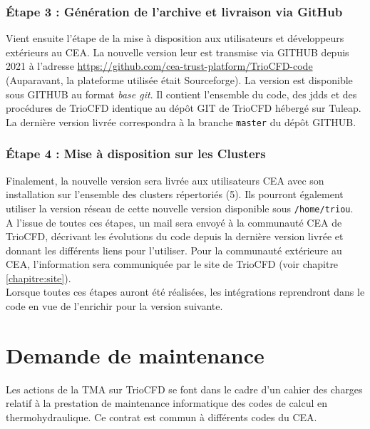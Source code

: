\subsection{Étape 3 : G\'en\'eration de l'archive et livraison via GitHub}
Vient ensuite l'étape de la mise à disposition aux utilisateurs et développeurs extérieurs au CEA.
La nouvelle version leur est transmise via GITHUB depuis 2021
à l'adresse \url{https://github.com/cea-trust-platform/TrioCFD-code}
(Auparavant, la plateforme utilisée était Sourceforge).
La version est disponible sous GITHUB au format \emph{base git}.
Il contient l'ensemble du code, des jdds et des procédures de TrioCFD
identique au dépôt GIT de TrioCFD hébergé sur Tuleap.
La dernière version livrée correspondra à la branche \texttt{master} du dépôt GITHUB.

\subsection{Étape 4 : Mise \`a disposition sur les Clusters}
Finalement, la nouvelle version sera livrée aux utilisateurs CEA avec son installation
sur l'ensemble des clusters répertoriés (5).
Ils pourront également utiliser la version réseau de cette nouvelle
version disponible sous \texttt{/home/triou}.\\

A l'issue de toutes ces étapes, un mail sera envoyé à la communauté CEA de TrioCFD,
décrivant les évolutions du code depuis la dernière version livrée et
donnant les différents liens pour l'utiliser. Pour la communauté extérieure au CEA,
l'information sera communiquée par le site de TrioCFD (voir chapitre \ref{chapitre:site}).\\

Lorsque toutes ces \'etapes auront \'et\'e r\'ealis\'ees,
les intégrations reprendront dans le code en vue de l'enrichir pour la version suivante.

\chapter{Demande de maintenance}
Les actions de la TMA sur TrioCFD se font dans le cadre d'un cahier des charges relatif à
la prestation de maintenance informatique des codes de calcul en thermohydraulique.
Ce contrat est commun à différents codes du CEA.\\

